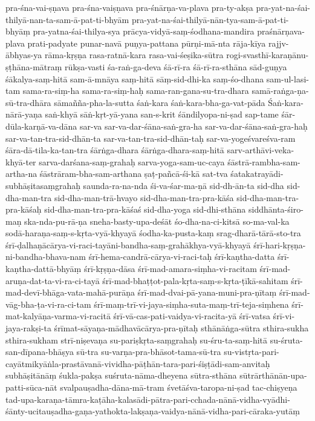 {{pra-śna-vai-ṣṇava
pra-śna-vaiṣṇava
pra-śnārṇa-va-plava
pra-ty-akṣa
pra-yat-na-śai-thilyā-nan-ta-sam-ā-pat-ti-bhyām
pra-yat-na-śai-thilyā-nān-tya-sam-ā-pat-ti-bhyāṃ
pra-yatna-śai-thilya-sya
prācya-vidyā-saṃ-śodhana-mandira
praśnārṇava-plava
prati-padyate
punar-navā
puṇya-pattana
pūrṇi-mā-nta
rāja-kīya
rajjv-ābhyas-ya
rāma-kṛṣṇa
rasa-ratnā-kara
rasa-vai-śeṣika-sūtra
rogi-svasthī-karaṇānu-ṣṭhāna-mātraṃ
rūkṣa-vasti
śa-raṅ-ga-deva
śā-rī-ra
śā-rī-ra-sthāna
sād-guṇya
śākalya-saṃ-hitā
sam-ā-mnāya
saṃ-hitā
sāṃ-sid-dhi-ka
saṃ-śo-dhana
sam-ul-lasi-tam
sama-ra-siṃ-ha
sama-ra-siṃ-haḥ
sama-ran-gana-su-tra-dhara
samā-raṅga-ṇa-sū-tra-dhāra
sāmañña-pha-la-sutta
śaṅ-kara
śaṅ-kara-bha-ga-vat-pāda
Śaṅ-kara-nārā-yaṇa
saṅ-khyā
sāṅ-kṛt-yā-yana
san-s-krit
śāndilyopa-ni-ṣad
sap-tame
śār-dūla-karṇā-va-dāna
sar-va
sar-va-dar-śāna-saṅ-gra-ha
sar-va-dar-śāna-saṅ-gra-haḥ
sar-va-tan-tra-sid-dhān-ta
sar-va-tan-tra-sid-dhān-taḥ
sar-va-yogeśvareśva-ram
śāra-dā-tila-ka-tan-tra
śārṅga-dhara
śārṅga-dhara-saṃ-hitā
sarv-arthāvi-veka-khyā-ter
sarva-darśana-saṃ-grahaḥ
sarva-yoga-sam-uc-caya
śāstrā-rambha-sam-artha-na
śāstrāram-bha-sam-arthana
ṣaṭ-pañcā-śi-kā
sat-tva
śatakatrayādi-subhāṣitasaṃgrahaḥ
saunda-ra-na-nda
śi-va-śar-ma-ṇā
sid-dh-ān-ta
sid-dha
sid-dha-man-tra
sid-dha-man-trā-hvayo
sid-dha-man-tra-pra-kāśa
sid-dha-man-tra-pra-kāśaḥ
sid-dha-man-tra-pra-kāśaś
sid-dha-yoga
sid-dhi-sthāna
siddhānta-śiro-maṇ
ska-nda-pu-rā-ṇa
sneha-basty-upa-deśāt
śo-dha-na-ci-kitsā
so-ma-val-ka
sodā-haraṇa-saṃ-s-kṛta-vyā-khyayā
śodha-ka-pusta-kaṃ
srag-dharā-tārā-sto-tra
śrī-ḍalhaṇācārya-vi-raci-tayāni-bandha-saṃ-grahākhya-vyā-khyayā
śrī-hari-kṛṣṇa-ni-bandha-bhava-nam
śrī-hema-candrā-cārya-vi-raci-taḥ
śrī-kaṇtha-datta
śrī-kaṇtha-dattā-bhyāṃ
śrī-kṛṣṇa-dāsa
śrī-mad-amara-siṃha-vi-racitam
śrī-mad-aruṇa-dat-ta-vi-ra-ci-tayā
śrī-mad-bhaṭṭot-pala-kṛta-saṃ-s-kṛta-ṭīkā-sahitam
śrī-mad-devī-bhāga-vata-mahā-purāṇa
śrī-mad-dvai-pā-yana-muni-pra-ṇītaṃ
śrī-mad-vāg-bha-ṭa-vi-ra-ci-tam
śrī-maṃ-trī-vi-jaya-siṃha-suta-maṃ-trī-teja-siṃhena
śrī-mat-kalyāṇa-varma-vi-racitā
śrī-vā-cas-pati-vaidya-vi-racita-yā
śrī-vatsa
śrī-vi-jaya-rakṣi-ta
śrīmat-sāyaṇa-mādhavācārya-pra-ṇītaḥ
sthānāṅga-sūtra
sthira-sukha
sthira-sukham
strī-niṣevaṇa
su-pariṣkṛta-saṃgrahaḥ
su-śru-ta-saṃ-hitā
su-śruta-san-dīpana-bhāṣya
sū-tra
su-varṇa-pra-bhāsot-tama-sū-tra
su-vistṛta-pari-cayātmikyāṅla-prastāvanā-vividha-pāṭhān-tara-pari-śiṣṭādi-sam-anvitaḥ
subhāṣitānāṃ
śukla-pakṣa
suśruta-nāma-dheyena
sūtra-sthāna
sūtrārthānān-upa-patti-sūca-nāt
svalpauṣadha-dāna-mā-tram
śvetāśva-taropa-ni-ṣad
tac-chiṣyeṇa
tad-upa-karaṇa-tāmra-kaṭāha-kalasādi-pātra-pari-cchada-nānā-vidha-vyādhi-śānty-ucitauṣadha-gaṇa-yathokta-lakṣaṇa-vaidya-nānā-vidha-pari-cāraka-yutāṃ
}}

